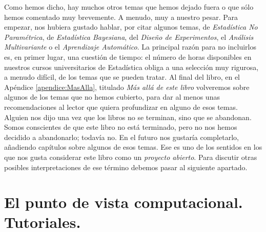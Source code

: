 Como hemos dicho, hay muchos otros temas que hemos dejado fuera o que sólo hemos comentado muy brevemente. A menudo, muy a nuestro pesar. Para empezar, nos hubiera gustado hablar, por citar algunos temas, de {\em Estadística No Paramétrica}, de {\em Estadística Bayesiana}, del {\em Diseño de Experimentos}, el {\em Análisis Multivariante} o el {\em Aprendizaje Automático}. La principal razón para no incluirlos es, en primer lugar, una cuestión de tiempo: el número de horas disponibles en nuestros cursos universitarios de Estadística obliga a una selección muy rigurosa, a menudo difícil, de los temas que se pueden tratar. Al final del libro, en el Apéndice \ref{apendice:MasAlla}, titulado {\em Más allá de este libro} volveremos sobre algunos de los temas que no hemos cubierto, para dar al menos unas recomendaciones al lector que quiera profundizar en alguno de esos temas. Alguien nos dijo una vez que los libros no se terminan, sino que se abandonan. Somos conscientes de que este libro no está terminado, pero no nos hemos decidido a abandonarlo; todavía no. En el futuro nos gustaría completarlo, añadiendo capítulos sobre algunos de esos temas. Ese es uno de los sentidos en los que nos gusta considerar este libro como un {\em proyecto abierto}. Para discutir otras posibles interpretaciones de ese término debemos pasar al siguiente apartado.
\pagebreak

\section*{El punto de vista computacional. Tutoriales.}
\label{prefacio:subsec:Tutoriales}

